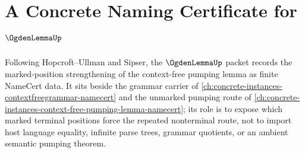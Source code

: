 \chapter{A Concrete Naming Certificate for $\OgdenLemmaUp$}
\label{ch:concrete-instances-ogden-lemma-namecert}

Following Hopcroft--Ullman and Sipser, the $\OgdenLemmaUp$ packet records the
marked-position strengthening of the context-free pumping lemma as finite
NameCert data. It sits beside the grammar carrier of
\autoref{ch:concrete-instances-contextfreegrammar-namecert} and the
unmarked pumping route of
\autoref{ch:concrete-instances-context-free-pumping-lemma-namecert}; its role
is to expose which marked terminal positions force the repeated nonterminal
route, not to import host language equality, infinite parse trees, grammar
quotients, or an ambient semantic pumping theorem.

